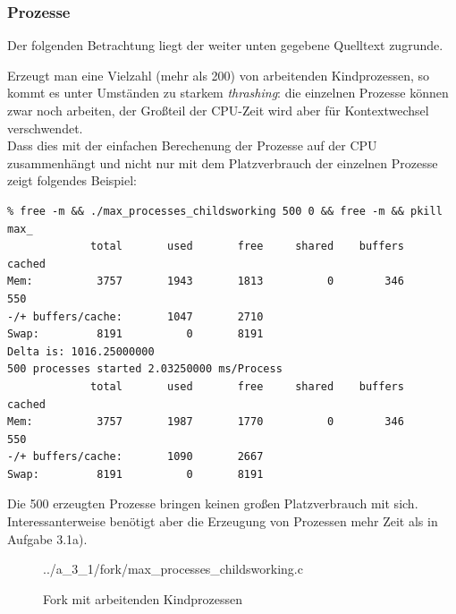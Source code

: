 \documentclass[a4paper,
12pt,
BCOR12mm,
]{scrartcl}
\begin{document}
\subsubsection{Prozesse}
Der folgenden Betrachtung liegt der weiter unten gegebene Quelltext zugrunde.
\begin{figure}[h!]
	\begin{center}
	\end{center}
\end{figure}
Erzeugt man eine Vielzahl (mehr als 200) von arbeitenden Kindprozessen, so kommt es unter Umständen zu
starkem \emph{thrashing}: die einzelnen Prozesse können zwar noch arbeiten, der Großteil
der CPU-Zeit wird aber für Kontextwechsel verschwendet.\\
Dass dies mit der einfachen Berechenung der Prozesse auf der CPU zusammenhängt und nicht
nur mit dem Platzverbrauch der einzelnen Prozesse zeigt folgendes Beispiel:

\begin{verbatim}
% free -m && ./max_processes_childsworking 500 0 && free -m && pkill max_
             total       used       free     shared    buffers     cached
Mem:          3757       1943       1813          0        346        550
-/+ buffers/cache:       1047       2710
Swap:         8191          0       8191
Delta is: 1016.25000000
500 processes started 2.03250000 ms/Process
             total       used       free     shared    buffers     cached
Mem:          3757       1987       1770          0        346        550
-/+ buffers/cache:       1090       2667
Swap:         8191          0       8191
\end{verbatim}
Die 500 erzeugten Prozesse bringen keinen großen Platzverbrauch mit sich.
Interessanterweise benötigt aber die Erzeugung von Prozessen mehr Zeit als in Aufgabe
3.1a).
\begin{figure}[h!]
	\begin{center}
		 {../a_3_1/fork/max_processes_childsworking.c}
	\end{center}
	\caption{Fork mit arbeitenden Kindprozessen}
	\label{fig:fork_childsworking_listing}
\end{figure}
\end{document}
